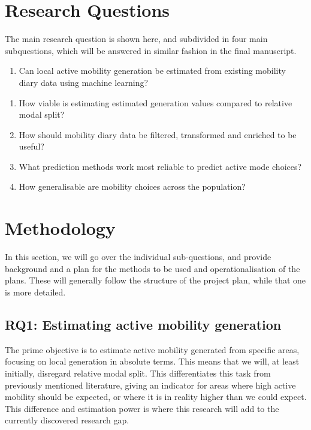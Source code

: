 \documentclass[sigconf, natbib=false, nonacm]{acmart}
\begin{document}
\section{Research Questions}
    The main research question is shown here, and subdivided in four main subquestions, which will be answered in similar fashion in the final manuscript. 
    \label{section:rq}
    \begin{enumerate}[label=RQ]
        \item Can local active mobility generation be estimated from existing mobility diary data using machine learning?
    \end{enumerate}
    \begin{enumerate}[label=SQ\arabic*]
        \item How viable is estimating estimated generation values compared to relative modal split? 
        \item How should mobility diary data be filtered, transformed and enriched to be useful?
        \item What prediction methods work most reliable to predict active mode choices?
        \item How generalisable are mobility choices across the population?
    \end{enumerate}

\section{Methodology}\label{section:methodology}
    In this section, we will go over the individual sub-questions, and provide background and a plan for the methods to be used and operationalisation of the plans. These will generally follow the structure of the project plan, while that one is more detailed. 

    \subsection{RQ1: Estimating active mobility generation}
    The prime objective is to estimate active mobility generated from specific areas, focusing on local generation in absolute terms. This means that we will, at least initially, disregard relative modal split. This differentiates this task from previously mentioned literature, giving an indicator for areas where high active mobility should be expected, or where it is in reality higher than we could expect. This difference and estimation power is where this research will add to the currently discovered research gap.
\end{document}
